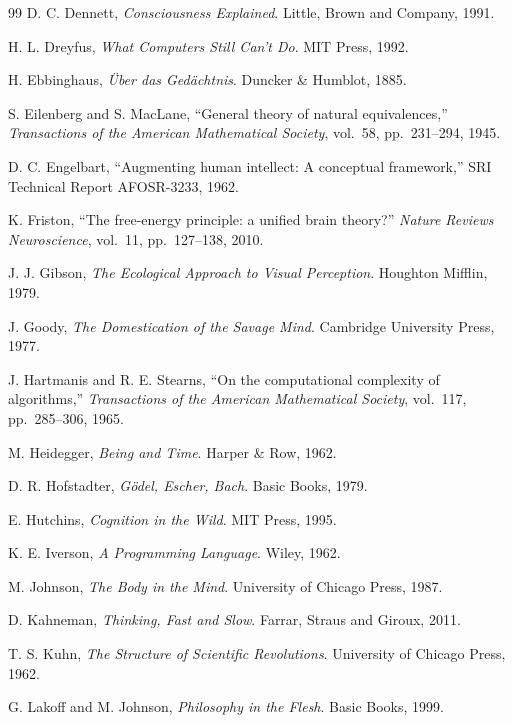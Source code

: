 \documentclass[12pt,oneside]{book}
\theoremstyle{plain}
\theoremstyle{definition}
\theoremstyle{plain}
\begin{document}
\begin{thebibliography}{99}
D. C. Dennett,
\textit{Consciousness Explained}.
Little, Brown and Company, 1991.

H. L. Dreyfus,
\textit{What Computers Still Can't Do}.
MIT Press, 1992.

H. Ebbinghaus,
\textit{{\"U}ber das Ged{\"a}chtnis}.
Duncker \& Humblot, 1885.

S. Eilenberg and S. MacLane,
``General theory of natural equivalences,''
\textit{Transactions of the American Mathematical Society}, vol.~58, pp.~231--294, 1945.

D. C. Engelbart,
``Augmenting human intellect: A conceptual framework,''
SRI Technical Report AFOSR-3233, 1962.

K. Friston,
``The free-energy principle: a unified brain theory?''
\textit{Nature Reviews Neuroscience}, vol.~11, pp.~127--138, 2010.

J. J. Gibson,
\textit{The Ecological Approach to Visual Perception}.
Houghton Mifflin, 1979.

J. Goody,
\textit{The Domestication of the Savage Mind}.
Cambridge University Press, 1977.

J. Hartmanis and R. E. Stearns,
``On the computational complexity of algorithms,''
\textit{Transactions of the American Mathematical Society}, vol.~117, pp.~285--306, 1965.

M. Heidegger,
\textit{Being and Time}.
Harper \& Row, 1962.

D. R. Hofstadter,
\textit{G{\"o}del, Escher, Bach}.
Basic Books, 1979.

E. Hutchins,
\textit{Cognition in the Wild}.
MIT Press, 1995.

K. E. Iverson,
\textit{A Programming Language}.
Wiley, 1962.

M. Johnson,
\textit{The Body in the Mind}.
University of Chicago Press, 1987.

D. Kahneman,
\textit{Thinking, Fast and Slow}.
Farrar, Straus and Giroux, 2011.

T. S. Kuhn,
\textit{The Structure of Scientific Revolutions}.
University of Chicago Press, 1962.

G. Lakoff and M. Johnson,
\textit{Philosophy in the Flesh}.
Basic Books, 1999.


\end{thebibliography}
\end{document}
